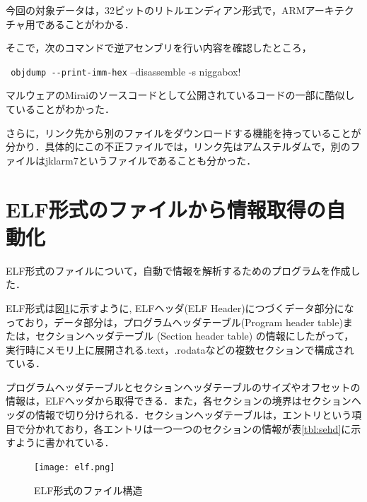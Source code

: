 \documentclass[dvipdfmx]{bta}
\begin{document}
今回の対象データは，32ビットのリトルエンディアン形式で，ARMアーキテクチャ用であることがわかる．

そこで，次のコマンドで逆アセンブリを行い内容を確認したところ，

\verb! objdump --print-imm-hex!
--disassemble -s niggabox!

マルウェアのMiraiのソースコード\cite{Mirai}として公開されているコードの一部に酷似していることがわかった．

さらに，リンク先から別のファイルをダウンロードする機能を持っていることが分かり．具体的にこの不正ファイルでは，リンク先はアムステルダムで，別のファイルはjklarm7というファイルであることも分かった．



\section{ELF形式のファイルから情報取得の自動化}
ELF形式のファイルについて，自動で情報を解析するためのプログラムを作成した．

ELF形式は図\ref{fig:elf}に示すように,
ELFヘッダ(ELF Header)につづくデータ部分になっており，データ部分は，プログラムヘッダテーブル(Program header table)または，セクションヘッダテーブル (Section header table) の情報にしたがって，
実行時にメモリ上に展開される.text，.rodataなどの複数セクションで構成されている．

プログラムヘッダテーブルとセクションヘッダテーブルのサイズやオフセットの情報は，ELFヘッダから取得できる．また，各セクションの境界はセクションヘッダの情報で切り分けられる．セクションヘッダテーブルは，エントリという項目で分かれており，各エントリは一つ一つのセクションの情報が表\ref{tbl:sehd}に示すように書かれている．


\begin{figure}[htbp]
	\centering
 	\texttt{[image: elf.png]}
 	\caption{ELF形式のファイル構造}\label{fig:elf}
\end{figure}
\end{document}
